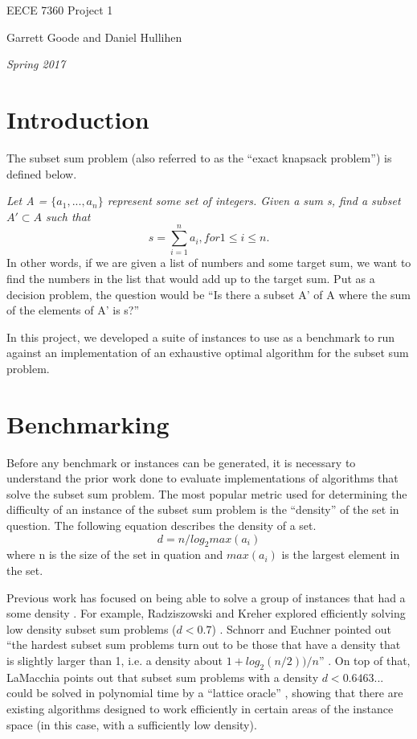 \documentclass{article}
\begin{document}
\centerline{\sc \large EECE 7360 Project 1}
\vspace{.5pc}
\centerline{\sc Garrett Goode and Daniel Hullihen}
\centerline{\it Spring 2017}

\section{Introduction}
The subset sum problem (also referred to as the ``exact knapsack problem'')
is defined below.

\textit{Let A = $\{a_1, ..., a_n\}$ represent some set of integers. Given a sum s, find a subset $A' \subset A$ such that
  $$s = \sum_{i=1}^n a_i, for 1 \le i \le n.$$}
In other words, if we are given a list of numbers and some target sum, we want
to find the numbers in the list that would add up to the target sum. Put as a decision
problem, the question would be ``Is there a subset A' of A where the sum of the
elements of A' is s?''

In this project, we developed a suite of instances to use as a benchmark to run
against an implementation of an exhaustive optimal algorithm for the subset
sum problem.

\section{Benchmarking}
Before any benchmark or instances can be generated, it is necessary to understand
the prior work done to evaluate implementations of algorithms that solve the
subset sum problem. The most popular metric used for determining the difficulty of
an instance of the subset sum problem is the ``density'' of the set in question.
The following equation
describes the density of a set.
$$d = n / log_2 max(a_i)$$
where n is the size of the set in quation and $max(a_i)$ is the largest element in the set.

Previous work has focused on being able to solve a
group of instances that had a some density \cite {lagarias1985}.
For example, Radziszowski and Kreher explored efficiently solving low density subset
sum problems ($d < 0.7$) \cite {kreher1988}. Schnorr and Euchner pointed out
``the hardest subset sum problems turn out to be those that
have a density that is slightly larger than 1, i.e. a density about
$1 + log_2(n/2))/n$'' \cite {schnorr94}.
On top of that, LaMacchia points out that subset sum problems with a density
$d < 0.6463...$ could be solved in polynomial time by a
``lattice oracle'' \cite {lamacchia91}, showing that there are existing algorithms
designed to work efficiently in certain areas of the instance space (in this
case, with a sufficiently low density). 
\end{document}
